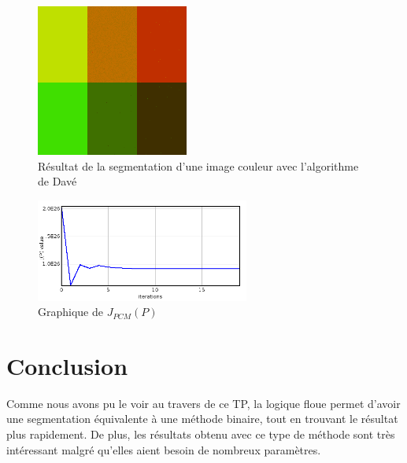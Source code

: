 \documentclass[a4paper,11pt]{article}
\begin{document}
\begin{figure}[!h]
  \begin{center}
    \includegraphics[width=5cm]{resultat/DAV.png}
    \caption{Résultat de la segmentation d'une image couleur avec l'algorithme de Davé}
    \label{fig:dave}
  \end{center}
\end{figure}

\begin{figure}[!h]
  \begin{center}
    \includegraphics[width=7cm]{resultat/DAV_graph.png}
    \caption{Graphique de $J_{PCM}(P)$}
    \label{fig:graphDAVE}
  \end{center}
\end{figure}

\newpage
\section{Conclusion}
Comme nous avons pu le voir au travers de ce TP, la logique floue permet d'avoir 
une segmentation équivalente à une méthode binaire, tout en trouvant le résultat 
plus rapidement. De plus, les résultats obtenu avec ce type de méthode sont très 
intéressant malgré qu'elles aient besoin de nombreux paramètres. 
  
\end{document}
